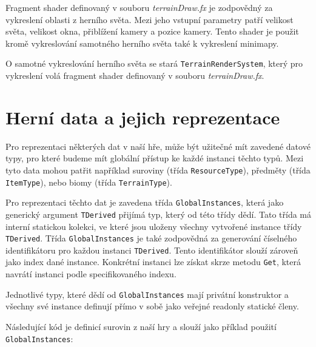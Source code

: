 Fragment shader definovaný v souboru \textit{terrainDraw.fx} je zodpovědný za vykreslení oblasti z herního světa. Mezi jeho vstupní parametry patří velikost světa, velikost okna, přiblížení kamery a pozice kamery. Tento shader je použit kromě vykreslování samotného herního světa také k vykreslení minimapy.

O samotné vykreslování herního světa se stará \texttt{TerrainRenderSystem}, který pro vykreslení volá fragment shader definovaný v souboru \textit{terrainDraw.fx}.

\section{Herní data a jejich reprezentace}
Pro reprezentaci některých dat v naší hře, může být užitečné mít zavedené datové typy, pro které budeme mít globální přístup ke každé instanci těchto typů. Mezi tyto data mohou patřit například suroviny (třída \texttt{ResourceType}), předměty (třída \texttt{ItemType}), nebo biomy (třída \texttt{TerrainType}).

Pro reprezentaci těchto dat je zavedena třída \texttt{GlobalInstances}, která jako generický argument \texttt{TDerived} přijímá typ, který od této třídy dědí. Tato třída má interní statickou kolekci, ve které jsou uloženy všechny vytvořené instance třídy \texttt{TDerived}. Třída \texttt{GlobalInstances} je také zodpovědná za generování číselného identifikátoru pro každou instanci \texttt{TDerived}. Tento identifikátor slouží zároveň jako index dané instance. Konkrétní instanci lze získat skrze metodu \texttt{Get}, která navrátí instanci podle specifikovaného indexu.

Jednotlivé typy, které dědí od \texttt{GlobalInstances} mají privátní konstruktor a všechny své instance definují přímo v sobě jako veřejné readonly statické členy.

Následující kód je definicí surovin z naší hry a slouží jako příklad použití \texttt{GlobalInstances}:

